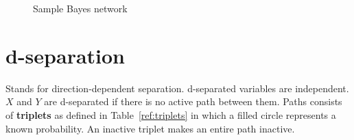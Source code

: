 \documentclass{report}
\begin{document}
\begin{figure}[h!]
\centering
{}
\caption{Sample Bayes network}
\label{ref:samplenetwork}
\end{figure}

\section{d-separation}
Stands for direction-dependent separation. d-separated variables are independent. $X$ and $Y$ are d-separated if there is no active path between them.
Paths consists of {\bf triplets} as defined in Table~\ref{ref:triplets} in which a filled circle represents a known probability. An inactive triplet makes an entire path inactive. \\
\end{document}

